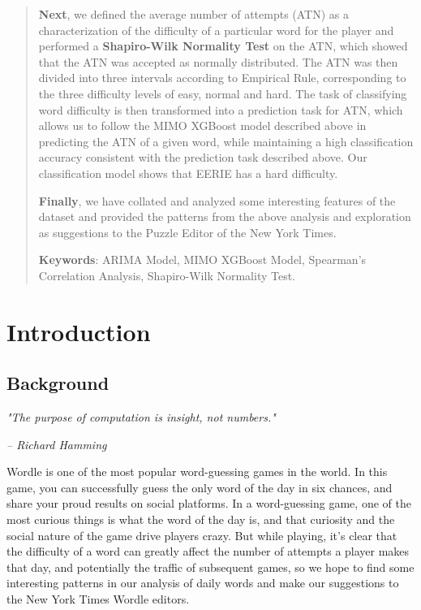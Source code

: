 \documentclass[12pt]{article}  %
\begin{document}
\begin{abstract}
    \textbf{Next}, we defined the average number of attempts (ATN) as a characterization of the difficulty of a particular word for the player and performed a \textbf{Shapiro-Wilk Normality Test} on the ATN, which showed that the ATN was accepted as normally distributed. The ATN was then divided into three intervals according to Empirical Rule, corresponding to the three difficulty levels of easy, normal and hard. The task of classifying word difficulty is then transformed into a prediction task for ATN, which allows us to follow the MIMO XGBoost model described above in predicting the ATN of a given word, while maintaining a high classification accuracy consistent with the prediction task described above. Our classification model shows that EERIE has a hard difficulty.

    \textbf{Finally}, we have collated and analyzed some interesting features of the dataset and provided the patterns from the above analysis and exploration as suggestions to the Puzzle Editor of the New York Times.
    
    \textbf{Keywords}: ARIMA Model, MIMO XGBoost Model, Spearman's Correlation Analysis, Shapiro-Wilk Normality Test.
    

\end{abstract}

\maketitle  %
\tableofcontents  %


\section{Introduction}
\subsection{Background}
\textit{"The purpose of computation is insight, not numbers."} 
\begin{flushright}
    \textit{-- Richard Hamming}
\end{flushright}



Wordle is one of the most popular word-guessing games in the world. In this game, you can successfully guess the only word of the day in six chances, and share your proud results on social platforms. In a word-guessing game, one of the most curious things is what the word of the day is, and that curiosity and the social nature of the game drive players crazy. But while playing, it's clear that the difficulty of a word can greatly affect the number of attempts a player makes that day, and potentially the traffic of subsequent games, so we hope to find some interesting patterns in our analysis of daily words and make our suggestions to the New York Times Wordle editors.
\end{document}
